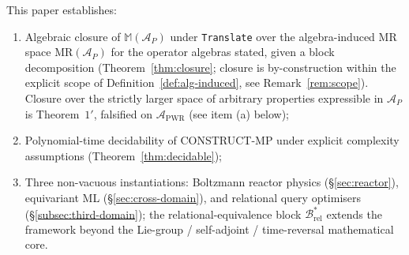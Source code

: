 \documentclass[acmsmall, screen]{acmart}
\begin{document}
\begin{tcolorbox}[colback=gray!5,colframe=black!50,arc=2pt,boxrule=0.5pt,fontupper=\small,title=Boundary of contribution,fonttitle=\small\bfseries]
This paper establishes:
\begin{enumerate}[leftmargin=*,nosep]
  \item Algebraic closure of $\mathbb{M}(\mathcal{A}_P)$ under \texttt{Translate} over the algebra-induced MR space $\mathrm{MR}(\mathcal{A}_P)$ for the operator algebras stated, given a block decomposition (Theorem~\ref{thm:closure}; closure is by-construction within the explicit scope of Definition~\ref{def:alg-induced}, see Remark~\ref{rem:scope}). Closure over the strictly larger space of arbitrary properties expressible in $\mathcal{A}_P$ is Theorem~$1'$, falsified on $\mathcal{A}_{\mathrm{PWR}}$ (see item (a) below);
  \item Polynomial-time decidability of CONSTRUCT-MP under explicit complexity assumptions (Theorem~\ref{thm:decidable});
  \item Three non-vacuous instantiations: Boltzmann reactor physics (\S\ref{sec:reactor}), equivariant ML (\S\ref{sec:cross-domain}), and relational query optimisers (\S\ref{subsec:third-domain}); the relational-equivalence block $\mathcal{B}^{*}_{\mathrm{rel}}$ extends the framework beyond the Lie-group / self-adjoint / time-reversal mathematical core.
\end{enumerate}


\end{tcolorbox}
\end{document}
